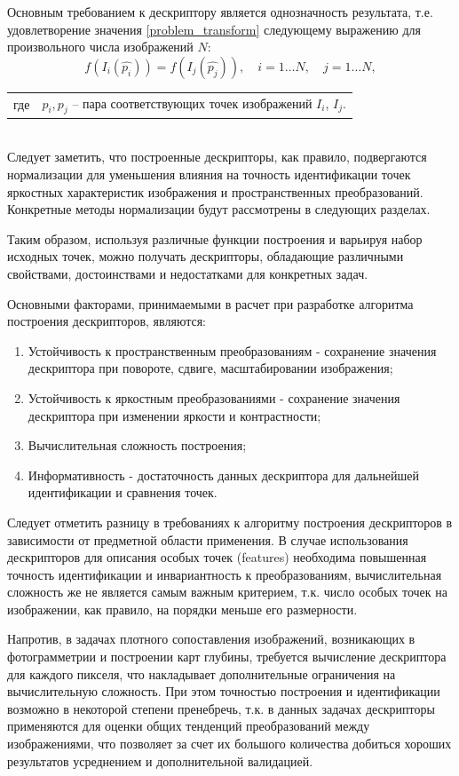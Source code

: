 {{	Основным требованием к дескриптору является однозначность результата, т.е. удовлетворение значения \eqref{problem_transform}  следующему выражению для произвольного числа изображений $N$:
	\begin{equation}\label{problem_constraints}
	f(I_i(\hat{p_i})) = f(I_j(\hat{p_j})), \quad i=1 \hdots N, \quad j=1 \hdots N,
	\end{equation} 
	\begin{tabular}{ rl }
	\quad \quad где 
	& $p_i, p_j$ -- пара соответствующих точек изображений $I_i$, $I_j$.
	\end{tabular}\\

	Следует заметить, что построенные дескрипторы, как правило, подвергаются нормализации для уменьшения влияния на точность идентификации точек яркостных характеристик изображения и пространственных преобразований. Конкретные методы нормализации будут рассмотрены в следующих разделах. 
	
	Таким образом, используя различные функции построения и варьируя набор исходных точек, можно получать дескрипторы, обладающие различными свойствами, достоинствами и недостатками для конкретных задач. 
	
	Основными факторами, принимаемыми в расчет при разработке алгоритма построения дескрипторов, являются:
	\begin{enumerate}
	   	\item Устойчивость к пространственным преобразованиям - сохранение значения дескриптора при повороте, сдвиге, масштабировании изображения;
	   	\item Устойчивость к яркостным преобразованиями - сохранение значения дескриптора при изменении яркости и контрастности;
	   	\item Вычислительная сложность построения;
	   	\item Информативность - достаточность данных дескриптора для дальнейшей идентификации и сравнения точек.
	\end{enumerate} 
	
	Следует отметить разницу в требованиях к алгоритму построения дескрипторов в зависимости от предметной области применения. В случае использования дескрипторов для описания особых точек (features) необходима повышенная точность идентификации и инвариантность к преобразованиям, вычислительная сложность же не является самым важным критерием, т.к. число особых точек на изображении, как правило, на порядки меньше его размерности. 
	
	Напротив, в задачах плотного сопоставления изображений, возникающих в фотограмметрии и построении карт глубины, требуется вычисление дескриптора для каждого пикселя, что накладывает дополнительные ограничения на вычислительную сложность. При этом точностью построения и идентификации возможно в некоторой степени пренебречь, т.к. в данных задачах дескрипторы применяются для оценки общих тенденций преобразований между изображениями, что позволяет за счет их большого количества добиться хороших результатов усреднением и дополнительной валидацией.
	
}}
